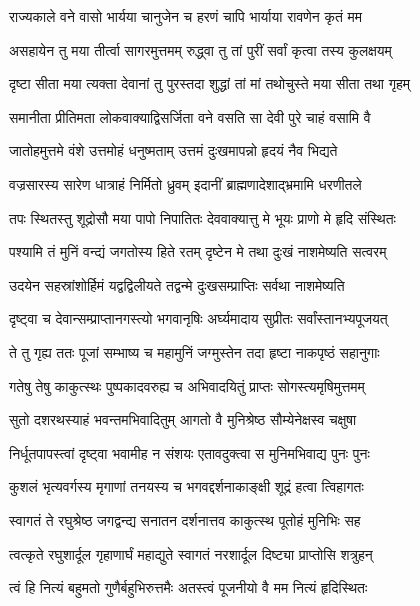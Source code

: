 \twolineshloka
{राज्यकाले वने वासो भार्यया चानुजेन च}
{हरणं चापि भार्याया रावणेन कृतं मम}%

\twolineshloka
{असहायेन तु मया तीर्त्वा सागरमुत्तमम्}
{रुद्ध्वा तु तां पुरीं सर्वां कृत्वा तस्य कुलक्षयम्}%

\twolineshloka
{दृष्टा सीता मया त्यक्ता देवानां तु पुरस्तदा}
{शुद्धां तां मां तथोचुस्ते मया सीता तथा गृहम्}%

\twolineshloka
{समानीता प्रीतिमता लोकवाक्याद्विसर्जिता}
{वने वसति सा देवी पुरे चाहं वसामि वै}%

\twolineshloka
{जातोहमुत्तमे वंशे उत्तमोहं धनुष्मताम्}
{उत्तमं दुःखमापन्नो हृदयं नैव भिद्यते}%

\twolineshloka
{वज्रसारस्य सारेण धात्राहं निर्मितो ध्रुवम्}
{इदानीं ब्राह्मणादेशाद्भ्रमामि धरणीतले}%

\twolineshloka
{तपः स्थितस्तु शूद्रोसौ मया पापो निपातितः}
{देववाक्यात्तु मे भूयः प्राणो मे हृदि संस्थितः}%

\twolineshloka
{पश्यामि तं मुनिं वन्द्यं जगतोस्य हिते रतम्}
{दृष्टेन मे तथा दुःखं नाशमेष्यति सत्वरम्}%

\twolineshloka
{उदयेन सहस्रांशोर्हिमं यद्वद्विलीयते}
{तद्वन्मे दुःखसम्प्राप्तिः सर्वथा नाशमेष्यति}%

\twolineshloka
{दृष्ट्वा च देवान्सम्प्राप्तानगस्त्यो भगवानृषिः}
{अर्घ्यमादाय सुप्रीतः सर्वांस्तानभ्यपूजयत्}%

\twolineshloka
{ते तु गृह्य ततः पूजां सम्भाष्य च महामुनिं}
{जग्मुस्तेन तदा हृष्टा नाकपृष्ठं सहानुगाः}%

\twolineshloka
{गतेषु तेषु काकुत्स्थः पुष्पकादवरुह्य च}
{अभिवादयितुं प्राप्तः सोगस्त्यमृषिमुत्तमम्}%


\twolineshloka
{सुतो दशरथस्याहं भवन्तमभिवादितुम्}
{आगतो वै मुनिश्रेष्ठ सौम्येनेक्षस्व चक्षुषा}%

\twolineshloka
{निर्धूतपापस्त्वां दृष्ट्वा भवामीह न संशयः}
{एतावदुक्त्वा स मुनिमभिवाद्य पुनः पुनः}%

\twolineshloka
{कुशलं भृत्यवर्गस्य मृगाणां तनयस्य च}
{भगवद्दर्शनाकाङ्क्षी शूद्रं हत्वा त्विहागतः}%


\twolineshloka
{स्वागतं ते रघुश्रेष्ठ जगद्वन्द्य सनातन}
{दर्शनात्तव काकुत्स्थ पूतोहं मुनिभिः सह}%

\twolineshloka
{त्वत्कृते रघुशार्दूल गृहाणार्घं महाद्युते}
{स्वागतं नरशार्दूल दिष्ट्या प्राप्तोसि शत्रुहन्}%

\twolineshloka
{त्वं हि नित्यं बहुमतो गुणैर्बहुभिरुत्तमैः}
{अतस्त्वं पूजनीयो वै मम नित्यं हृदिस्थितः}%

